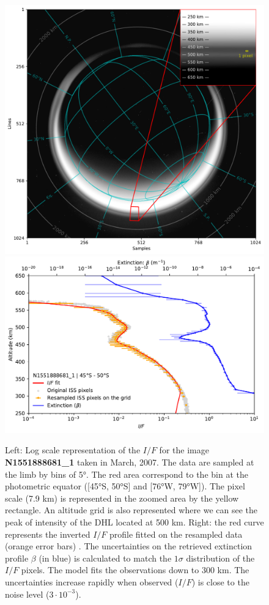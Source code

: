 \begin{figure}[!ht]
\includegraphics[width=.4\textwidth]{Fig/N1551888681_sampling}
\includegraphics[width=.57\textwidth]{Fig/Model_uncertainties}
\caption{Left: Log scale representation of the $I/F$  for the image
\textbf{N1551888681\_1} taken in March, 2007. The data are sampled at the limb by
bins of \ang{5}. The red area correspond to the bin at the photometric
equator ([\ang{45}S, \ang{50}S] and [\ang{76}W, \ang{79}W]). The pixel scale
(7.9 km) is represented in the zoomed area by the yellow rectangle.
An altitude grid is also represented where we can see the peak of intensity of the DHL
located at 500 km. Right: the red curve represents the inverted $I/F$ profile fitted
on the resampled data (orange error bars) .
The uncertainties on the retrieved extinction profile $\beta$ (in blue) is calculated to match the $1 \sigma$ distribution of the $I/F$ pixels. The model fits the observations down to 300 km.
The uncertainties increase rapidly when observed ($I/F$) is close
to the noise level ($3\cdot10^{-3}$).}
\label{fig:model_uncertainties}
\end{figure}
